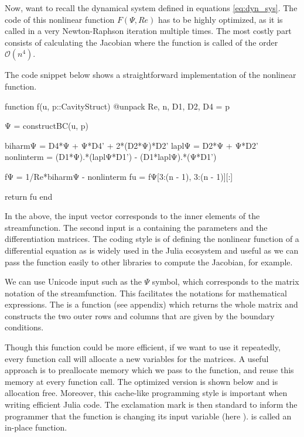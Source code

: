 Now, want to recall the dynamical system defined in equations \eqref{eq:dyn_sys}.
The code of this nonlinear function $F(\Psi, Re)$ has to be highly optimized,
as it is called in a very Newton-Raphson iteration multiple times. The most
costly part consists of calculating the Jacobian where the function is called
of the order $\mathcal{O}(n^4)$.

The code snippet below shows a straightforward implementation of the
nonlinear function. 


\begin{jllisting}[caption=Simple implementation in Julia of the nonlinear function $F$]
function f(u, p::CavityStruct)
    @unpack Re, n, D1, D2, D4 = p

    Ψ = constructBC(u, p)

    biharmΨ = D4*Ψ +  Ψ*D4' + 2*(D2*Ψ)*D2'
    laplΨ = D2*Ψ + Ψ*D2'
    nonlinterm = (D1*Ψ).*(laplΨ*D1') - (D1*laplΨ).*(Ψ*D1')
    
    fΨ = 1/Re*biharmΨ - nonlinterm
    fu = fΨ[3:(n - 1), 3:(n - 1)][:]

    return fu 
end
\end{jllisting}

In the above, the input vector  corresponds to the inner elements of
the streamfunction. The second input  is a 
containing the parameters and the differentiation matrices. The coding style is
of defining the nonlinear function of a differential equation as 
is widely used in the Julia ecosystem and useful as we can pass the function
easily to other libraries to compute the Jacobian, for example.

We can use Unicode input such as the $\Psi $ symbol, which corresponds to the
matrix notation of the streamfunction. This facilitates the notations for
mathematical expressions. The  is a function (see
appendix) which returns the whole matrix and constructs the two outer rows and
columns that are given by the boundary conditions.

Though this function could be more efficient, if we want to use it repeatedly,
every function call will allocate a new variables for the matrices. A useful
approach is to preallocate memory which we pass to the function, and reuse this
memory at every function call. The optimized version is shown below and is
allocation free. Moreover, this cache-like programming style is important when
writing efficient Julia code. The exclamation mark is then standard to inform
the programmer that the function is changing its input variable (here
).  is called an in-place function.


